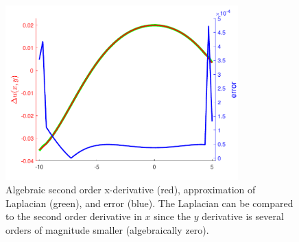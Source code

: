 \documentclass[paper=a4, fontsize=12pt]{article} %
\begin{document}
\begin{figure}[H]
  \centering
  \includegraphics[width=0.8\textwidth]{comparison-xx.pdf}
  \caption{\small Algebraic second order x-derivative (red), approximation of Laplacian (green), and error (blue). The Laplacian can be compared to the second order derivative in $x$ since the $y$ derivative is several orders of magnitude smaller (algebraically zero). \label{fig:2derivX}}
\end{figure}
\end{document}
